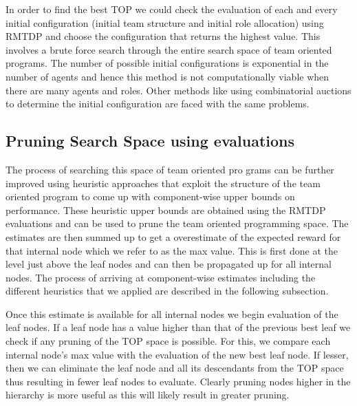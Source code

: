 \documentclass{IEEEtran}
\begin{document}
  In order to find the best TOP we could check the evaluation of each and every initial configuration (initial team
 structure and initial role allocation) using RMTDP and
 choose the configuration that returns the highest value. This
 involves a brute force search through the entire search space
 of team oriented programs. The number of possible initial configurations is exponential in the number of agents
 and hence this method is not computationally viable when
 there are many agents and roles. Other methods like using
 combinatorial auctions to determine the initial configuration \cite{Hunsberger2000ACA} are faced with the same problems.

 \subsection{\textbf{Pruning Search Space using evaluations}}
 The process of searching this space of team oriented pro
grams can be further improved using heuristic approaches
 that exploit the structure of the team oriented program to
 come up with component-wise upper bounds on performance. These heuristic upper bounds are obtained using the
 RMTDP evaluations and can be used to prune the team oriented programming space. The estimates are then summed
 up to get a overestimate of the expected reward for that internal node which we refer to as the max value. This is first
 done at the level just above the leaf nodes and can then be
 propagated up for all internal nodes. The process of arriving
 at component-wise estimates including the different heuristics that we applied are described in the following subsection.

  Once this estimate is available for all internal nodes we
 begin evaluation of the leaf nodes. If a leaf node has a value
 higher than that of the previous best leaf we check if any
 pruning of the TOP space is possible. For this, we compare
 each internal node's max value with the evaluation of the
 new best leaf node. If lesser, then we can eliminate the leaf
 node and all its descendants from the TOP space thus resulting in fewer leaf nodes to evaluate. Clearly pruning nodes
 higher in the hierarchy is more useful as this will likely result in greater pruning.
\end{document}

